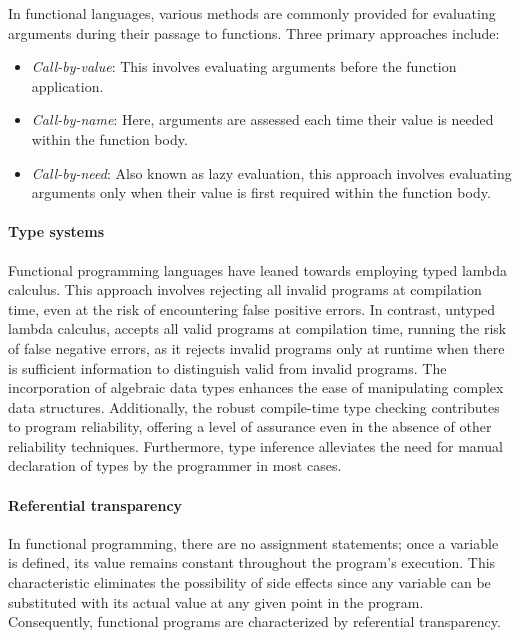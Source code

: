 In functional languages, various methods are commonly provided for evaluating arguments during their passage to functions. Three primary approaches include:

\begin{itemize}
    \item \textit{Call-by-value}: This involves evaluating arguments before the function application.
    \item \textit{Call-by-name}: Here, arguments are assessed each time their value is needed within the function body.
    \item \textit{Call-by-need}: Also known as lazy evaluation, this approach involves evaluating arguments only when their value is first required within the function body.
\end{itemize}

\paragraph{Type systems}

Functional programming languages have leaned towards employing typed lambda calculus. This approach involves rejecting all invalid programs at compilation time, even at the risk of encountering false positive errors. In contrast, untyped lambda calculus, accepts all valid programs at compilation time, running the risk of false negative errors, as it rejects invalid programs only at runtime when there is sufficient information to distinguish valid from invalid programs. The incorporation of algebraic data types enhances the ease of manipulating complex data structures. Additionally, the robust compile-time type checking contributes to program reliability, offering a level of assurance even in the absence of other reliability techniques. Furthermore, type inference alleviates the need for manual declaration of types by the programmer in most cases.

\paragraph{Referential transparency}

In functional programming, there are no assignment statements; once a variable is defined, its value remains constant throughout the program's execution. This characteristic eliminates the possibility of side effects since any variable can be substituted with its actual value at any given point in the program. Consequently, functional programs are characterized by referential transparency.

